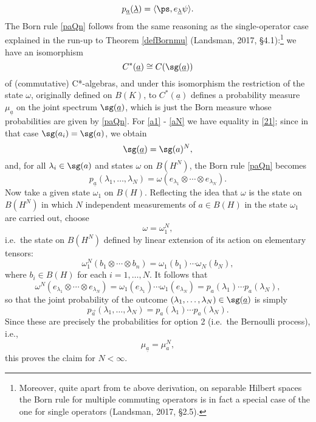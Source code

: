 \documentclass[12pt]{article}
\numberwithin{equation}{section}
\newcommand{\er}{\eqref}
\newcommand{\beq}{\begin{equation}}
\newcommand{\eeq}{\end{equation}}
\newcommand{\ul}{\underline}
\newcommand{\ot}{\otimes}
\newcommand{\la}{\langle} \newcommand{\ra}{\rangle}
\newcommand{\Hs}{Hilbert space} \newcommand{\Bs}{Banach space}
\newcommand{\lm}{\lambda} \newcommand{\Lm}{\Lambda}
\newcommand{\om}{\omega} \newcommand{\Om}{\Omega}
\begin{document}
 \begin{equation}
p_{\ul{a}}(\ul{\lm})=\la\ps,e_{\ul{\lm}}\psi\ra.\label{paQnp}
\end{equation}
The  Born rule \er{paQn} follows from the same reasoning as the single-operator case explained in the run-up to Theorem \ref{defBornmu} (Landsman, 2017, \S 4.1):\footnote{Moreover, quite apart from te above derivation, on separable \Hs s the  Born rule for  multiple commuting operators is in fact a special case of the one for single operators  (Landsman, 2017, \S 2.5).}
we have an isomorphism
\begin{equation}
C^*(\ul{a})\cong C(\sg(\ul{a}))
\end{equation}
of (commutative) C*-algebras, and under this isomorphism the restriction of the state $\om$, originally defined on $B(K)$, to $C^*(\ul{a})$ defines a probability measure $\mu_{\ul{a}}$ on the joint spectrum $\sg(\ul{a})$, which is just the Born measure whose probabilities are given by \er{paQn}.
For  \er{a1} - \er{aN} we have equality in \er{21}; since in that case $\sg(a_i)=\sg(a)$,  we obtain
\begin{equation}
\sg(\ul{a})=\sg(a)^N,
\end{equation}
and, for all $\lm_i\in\sg(a)$ and states $\om$ on $B(H^N)$, 
 the Born rule \er{paQn} becomes 
 \begin{equation}
p_{\ul{a}}(\lm_1, \ldots, \lm_N)=\om(e_{\lm_1}\ot\cdots\ot e_{\lm_N}).
\end{equation}
Now take a given state $\om_1$ on $B(H)$. Reflecting the idea that $\om$ is the state on $B(H^N)$ in which $N$ independent measurements of $a\in B(H)$ in the state $\om_1$ are carried out,
choose
 \beq
 \om=\om_1^N,
 \eeq
 i.e.\  the state on $B(H^N)$ defined by linear extension of its action on elementary tensors:
\beq
\om_1^N(b_1\ot\cdots\ot b_n)=\om_1(b_1) \cdots \om_N(b_N),
\eeq
where $b_i\in B(H)$ for each $i=1, \ldots, N$.
It follows that
\begin{equation}
\om^N(e_{\lm_1}\ot\cdots\ot e_{\lm_N})=\om_1(e_{\lm_1})\cdots\om_1(e_{\lm_N})=p_a(\lm_1)\cdots p_a(\lm_N),
\end{equation}
so that the joint probability of the outcome $(\lm_1, \ldots, \lm_N)\in\sg(\ul{a})$ is simply
\begin{equation}
p_{\vec{a}}(\lm_1, \ldots, \lm_N)=p_a(\lm_1)\cdots p_a(\lm_N).
\end{equation}
Since these are precisely the probabilities for option 2 (i.e.\ the Bernoulli process), i.e.,
 \beq
 \mu_{\ul{a}}=\mu_a^N, \label{mulaN}
 \eeq
 this
 proves the claim for $N<\infty$.  
 
\end{document}
